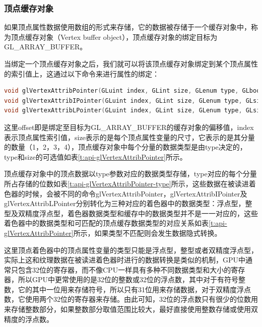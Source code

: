 \subsubsection{顶点缓存对象}
如果顶点属性数据使用数组的形式来存储，它的数据被存储于一个缓存对象中，称为顶点缓存对象（Vertex buffer object），顶点缓存对象的绑定目标为GL\_ARRAY\_BUFFER。

当绑定一个顶点缓存对象之后，我们就可以将该顶点缓存对象绑定到某个顶点属性的索引值上，这通过以下命令来进行属性的绑定：

\begin{lstlisting}[language=C++]
void glVertexAttribPointer​(GLuint index​, GLint size​, GLenum type​, GLboolean normalized​, GLsizei stride​, const void *offset​);
void glVertexAttribIPointer​(GLuint index​, GLint size​, GLenum type​, GLsizei stride​, const void *offset​);
void glVertexAttribLPointer​(GLuint index​, GLint size​, GLenum type​, GLsizei stride​, const void *offset​);
\end{lstlisting}

这里offset即是绑定至目标为GL\_ARRAY\_BUFFER的缓存对象的偏移值，index表示顶点属性索引值，size表示的是每个顶点属性变量的尺寸，它表示的是其分量的数量（1，2，3，4），顶点缓存对象中每个分量的数据类型是由type决定的，type和size的可选值如表\ref{t:api-glVertexAttribPointer}所示。

顶点缓存对象中的顶点数据以type参数对应的数据类型存储，type对应的每个分量所占存储的位数如表\ref{t:api-glVertexAttribPointer-type}所示，这些数据在被读进着色器的时候，会被不同的命令glVertexAttribPointer，glVertexAttribIPointer及glVertexAttribLPointer分别转化为三种对应的着色器中的数据类型：浮点型，整型及双精度浮点型，着色器数据类型和缓存中的数据类型并不是一一对应的，这些着色器中的数据类型和可匹配的顶点缓存数据类型的对应关系如表\ref{t:api-glVertexAttribPointer}所示，如果类型不匹配则会发生数据隐式转换。

\begin{myshaded}
这里顶点着色器中的顶点属性变量的类型只能是浮点型，整型或者双精度浮点型，实际上这和纹理数据在被读进着色器时进行的数据转换是类似的机制，GPU中通常只包含32位的寄存器，而不像CPU一样具有多种不同数据类型和大小的寄存器，所以GPU中更常使用的是32位的整数或32位的浮点数，其中对于有符号整数，它的其中一位用来存储符号，所以只有31位用来存储数据，对于双精度浮点数，它使用两个32位的寄存器来存储。由此可知，32位的浮点数只有很少的位数用来存储整数部分，如果整数部分取值范围比较大，最好直接使用整数存储或使用双精度的浮点数。
\end{myshaded}


